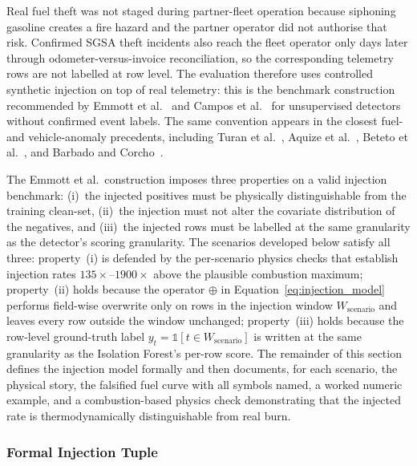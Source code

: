 Real fuel theft was not staged during partner-fleet operation because siphoning gasoline creates a fire hazard and the partner operator did not authorise that risk. Confirmed SGSA theft incidents also reach the fleet operator only days later through odometer-versus-invoice reconciliation, so the corresponding telemetry rows are not labelled at row level. The evaluation therefore uses controlled synthetic injection on top of real telemetry: this is the benchmark construction recommended by Emmott et al.~\cite{emmott2015systematic} and Campos et al.~\cite{campos2016unsupervised} for unsupervised detectors without confirmed event labels. The same convention appears in the closest fuel- and vehicle-anomaly precedents, including Turan et al.~\cite{turan2024detecting}, Aquize et al.~\cite{aquize2017self}, Beteto et al.~\cite{beteto2022anomaly}, and Barbado and Corcho~\cite{barbado2022interpretable}.

The Emmott et al.\ construction imposes three properties on a valid injection benchmark: (i)~the injected positives must be physically distinguishable from the training clean-set, (ii)~the injection must not alter the covariate distribution of the negatives, and (iii)~the injected rows must be labelled at the same granularity as the detector's scoring granularity. The scenarios developed below satisfy all three: property~(i) is defended by the per-scenario physics checks that establish injection rates $135\times$--$1900\times$ above the plausible combustion maximum; property~(ii) holds because the operator $\oplus$ in Equation~\ref{eq:injection_model} performs field-wise overwrite only on rows in the injection window $W_{\mathrm{scenario}}$ and leaves every row outside the window unchanged; property~(iii) holds because the row-level ground-truth label $y_t = \mathbb{1}[t \in W_{\mathrm{scenario}}]$ is written at the same granularity as the Isolation Forest's per-row score. The remainder of this section defines the injection model formally and then documents, for each scenario, the physical story, the falsified fuel curve with all symbols named, a worked numeric example, and a combustion-based physics check demonstrating that the injected rate is thermodynamically distinguishable from real burn.

\subsubsection{Formal Injection Tuple}

